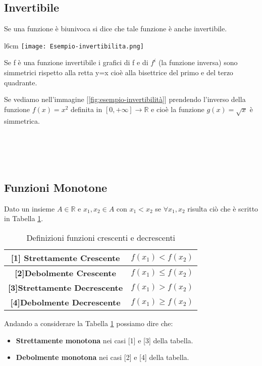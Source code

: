 \subsection{Invertibile}
\begin{definition}[Invertibile]
Se una funzione è biunivoca si dice che tale funzione è anche invertibile.
\end{definition}
\begin{wrapfigure}{l}{6cm}
    \centering
    \texttt{[image: Esempio-invertibilita.png]}
    \caption{$f(x) = x^2$ e $g(x) = \sqrt{x}$}
    \label{fig:esempio-invertibilità}
\end{wrapfigure}
Se f è una funzione invertibile i grafici di f e di $f^i$ (la funzione inversa) sono simmetrici rispetto alla retta y=x cioè alla bisettrice del primo e del terzo quadrante. \\
\begin{example}
Se vediamo nell'immagine [\ref{fig:esempio-invertibilità}] prendendo l'inverso della funzione $f(x) = x^2$ definita in $[0, +\infty] \longrightarrow \mathbb{R}$ e cioè la funzione $g(x) = \sqrt{x}$ è simmetrica.
\\ \\ \\ \\ \\
\end{example}

\subsection{Funzioni Monotone}
\begin{definition}[Monotone]
Dato un insieme $A \in \mathbb{R}$ e $x_1, x_2 \in A$ con $x_1 < x_2$ se $\forall x_1, x_2$ risulta ciò che è scritto in Tabella \ref{tab:monotone}.
\end{definition}
\begin{table}[h!]
    \centering
    \setlength{\tabcolsep}{6pt}
    \renewcommand{\arraystretch}{1.7}
    \begin{tabular}{|c|c|}
        \hline
        \textbf{[1] Strettamente Crescente} & $f(x_1) < f(x_2) $ \\ \hline
        \textbf{[2]Debolmente Crescente} & $f(x_1) \leq f(x_2) $ \\ \hline
        \textbf{[3]Strettamente Decrescente} & $f(x_1) > f(x_2) $ \\ \hline
        \textbf{[4]Debolmente Decrescente} & $f(x_1) \geq f(x_2) $ \\ \hline
    \end{tabular}
    \caption{Definizioni funzioni crescenti e decrescenti}
    \label{tab:monotone}
\end{table}
Andando a considerare la Tabella \ref{tab:monotone} possiamo dire che:
\begin{itemize}
    \item \textbf{Strettamente monotona} nei casi [1] e [3] della tabella.
    \item \textbf{Debolmente monotona} nei casi [2] e [4] della tabella.
\end{itemize}

